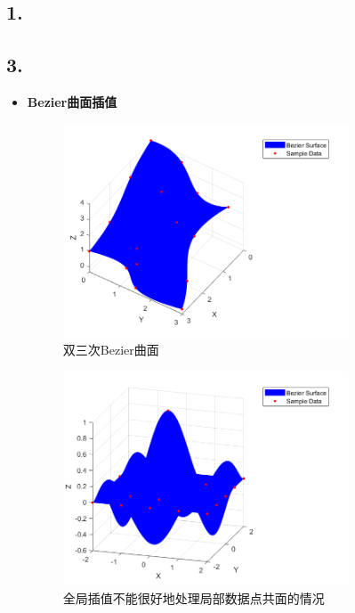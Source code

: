 \documentclass[utf8]{ctexart}
\begin{document}
\subsection*{1.}



\subsection*{3.}
\begin{itemize}
    \item \textbf{Bezier曲面插值}\\
    \begin{figure}[H]
        \centering
        \includegraphics[width=0.8\textwidth]{bezierSurfInterp.png}
        \caption{双三次Bezier曲面}
        \label{fig: bezierSurfInterp}
    \end{figure}
    \begin{figure}[H]
        \centering
        \includegraphics[width=0.8\textwidth]{bezierSurfInterp2.png}
        \caption{全局插值不能很好地处理局部数据点共面的情况}

\end{figure}
\end{itemize}
\end{document}
